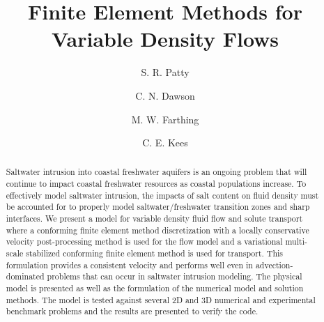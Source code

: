 \documentclass[letterpaper]{erdc}
\begin{document}
\frontmatter


\title{Finite Element Methods for Variable Density Flows}

\author{S. R. Patty}

\author{C. N. Dawson}

\author{M. W. Farthing \and C. E. Kees}

%
%




\begin{abstract}
 Saltwater intrusion into coastal freshwater aquifers is an ongoing problem that will continue to impact coastal freshwater resources as coastal populations increase.   To effectively model saltwater intrusion, the impacts of  salt content on fluid density must be accounted for to properly model saltwater/freshwater transition zones and sharp interfaces.  We present a model for variable density fluid flow and solute transport where a conforming finite element method discretization with a locally conservative velocity post-processing method is used for the flow model and a variational multi-scale stabilized conforming finite element method is used for transport.   This formulation provides a consistent velocity and performs well even in advection-dominated problems that can occur in saltwater intrusion modeling. The physical model is presented as well as the formulation of the numerical model and solution methods. The model is tested against several 2D and 3D numerical and experimental benchmark problems and the results are presented to verify the code. 
\end{abstract}
\end{document}
